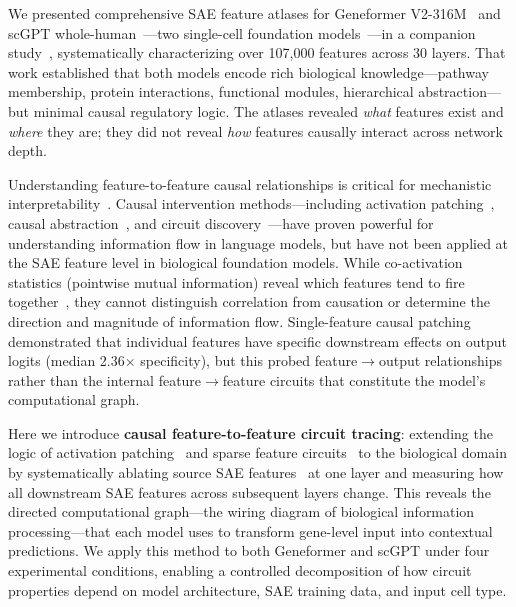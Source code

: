 \documentclass[onecolumn]{article}
\begin{document}
We presented comprehensive SAE feature atlases for Geneformer V2-316M~\citep{theodoris2023transfer} and scGPT whole-human~\citep{cui2024scgpt}---two single-cell foundation models~\citep{yang2022scbert,hao2024large}---in a companion study~\citep{kendiukhov2025sae_atlas}, systematically characterizing over 107,000 features across 30 layers. That work established that both models encode rich biological knowledge---pathway membership, protein interactions, functional modules, hierarchical abstraction---but minimal causal regulatory logic. The atlases revealed \emph{what} features exist and \emph{where} they are; they did not reveal \emph{how} features causally interact across network depth.

Understanding feature-to-feature causal relationships is critical for mechanistic interpretability~\citep{bereska2024mechanistic}. Causal intervention methods---including activation patching~\citep{vig2020causal,meng2022locating}, causal abstraction~\citep{geiger2021causal}, and circuit discovery~\citep{wang2023interpretability,marks2024sparse}---have proven powerful for understanding information flow in language models, but have not been applied at the SAE feature level in biological foundation models. While co-activation statistics (pointwise mutual information) reveal which features tend to fire together~\citep{manning1999foundations}, they cannot distinguish correlation from causation or determine the direction and magnitude of information flow. Single-feature causal patching~\citep{kendiukhov2025sae_atlas} demonstrated that individual features have specific downstream effects on output logits (median 2.36$\times$ specificity), but this probed feature$\to$output relationships rather than the internal feature$\to$feature circuits that constitute the model's computational graph.

Here we introduce \textbf{causal feature-to-feature circuit tracing}: extending the logic of activation patching~\citep{vig2020causal,geiger2021causal} and sparse feature circuits~\citep{marks2024sparse} to the biological domain by systematically ablating source SAE features~\citep{cunningham2023sparse,bricken2023monosemanticity} at one layer and measuring how all downstream SAE features across subsequent layers change. This reveals the directed computational graph---the wiring diagram of biological information processing---that each model uses to transform gene-level input into contextual predictions. We apply this method to both Geneformer and scGPT under four experimental conditions, enabling a controlled decomposition of how circuit properties depend on model architecture, SAE training data, and input cell type.
\end{document}
